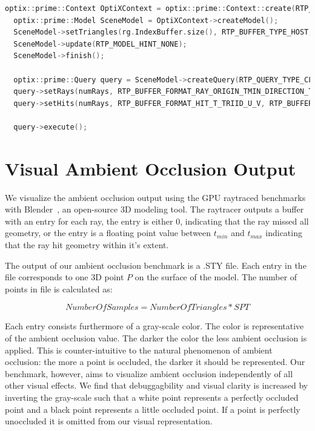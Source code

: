 \begin{lstlisting}[mathescape=true, caption={OptiX Prime~\cite{Parker:2010:OGP:1778765.1778803} query implementation},label={lst:optix_becnhmark}, language=C++]
  optix::prime::Context OptiXContext = optix::prime::Context::create(RTP_CONTEXT_TYPE_CUDA);
  optix::prime::Model SceneModel = OptiXContext->createModel();
  SceneModel->setTriangles(rg.IndexBuffer.size(), RTP_BUFFER_TYPE_HOST, rg.IndexBuffer.data(), rg.VertexBuffer.size(), RTP_BUFFER_TYPE_HOST, rg.VertexBuffer.data());
  SceneModel->update(RTP_MODEL_HINT_NONE);
  SceneModel->finish();

  optix::prime::Query query = SceneModel->createQuery(RTP_QUERY_TYPE_CLOSEST);
  query->setRays(numRays, RTP_BUFFER_FORMAT_RAY_ORIGIN_TMIN_DIRECTION_TMAX, RTP_BUFFER_TYPE_CUDA_LINEAR, rg.cudaRays);
  query->setHits(numRays, RTP_BUFFER_FORMAT_HIT_T_TRIID_U_V, RTP_BUFFER_TYPE_CUDA_LINEAR, cudaHits);

  query->execute();
\end{lstlisting}

\section{Visual Ambient Occlusion Output}  
\label{sec:visual_ao}

We visualize the ambient occlusion output using the GPU raytraced benchmarks with Blender~\cite{blender_citation}, an open-source 3D modeling tool.
The raytracer outputs a buffer with an entry for each ray, the entry is either 0, indicating that the ray missed all geometry, or the entry is a floating point value between $t_{min}$ and $t_{max}$ indicating that the ray hit geometry within it's extent.

The output of our ambient occlusion benchmark is a .STY file. Each entry in the file corresponds to one 3D point $P$ on the surface of the model. The number of points in file is calculated as:

\begin{equation}
\label{eq:trivial_num_samples}
  NumberOfSamples = NumberOfTriangles * SPT
\end{equation}

Each entry consists furthermore of a gray-scale color. The color is representative of the ambient occlusion value. The darker the color the less ambient occlusion is applied. This is counter-intuitive to the natural phenomenon of ambient occlusion: the more a point is occluded, the darker it should be represented. Our benchmark, however, aims to visualize ambient occlusion independently of all other visual effects. We find that debuggagbility and visual clarity is increased by inverting the gray-scale such that a white point represents a perfectly occluded point and a black point represents a little occluded point.
If a point is perfectly unoccluded it is omitted from our visual representation. 

